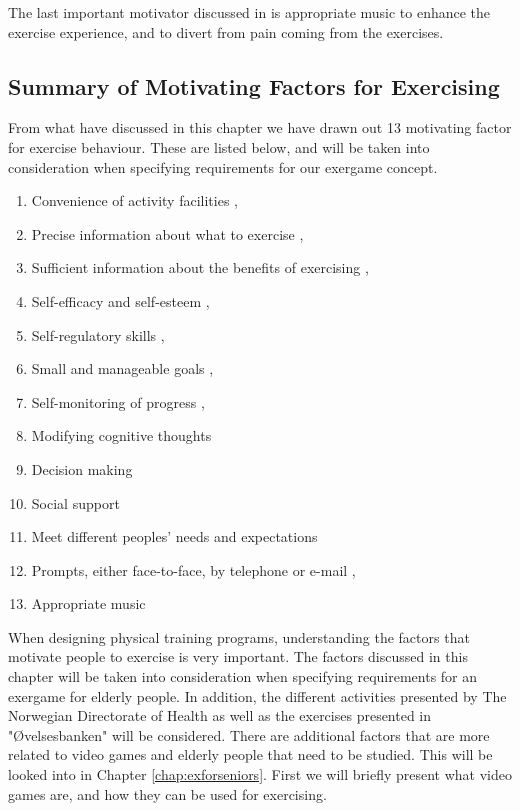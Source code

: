 The last important motivator discussed in \cite{schutzer} is appropriate music to enhance the exercise experience, and to divert from pain coming from the exercises. 


\subsection{Summary of Motivating Factors for Exercising}
\label{subsec:motivator}

From what have discussed in this chapter we have drawn out 13 motivating factor for exercise behaviour. These are listed below, and will be taken into consideration when specifying requirements for our exergame concept. 

\begin{enumerate}[{m}.1]
\item Convenience of activity facilities \cite{chao}, \cite{schutzer}
\item Precise information about what to exercise \cite{chao}, \cite{schutzer}
\item Sufficient information about the benefits of exercising \cite{chao}, \cite{schutzer}
\item Self-efficacy and self-esteem \cite{schutzer}, \cite{white}
\item Self-regulatory skills \cite{chao}, \cite{schutzer}
\item Small and manageable goals \cite{chao},\cite{schutzer}
\item Self-monitoring of progress \cite{chao},\cite{schutzer}
\item Modifying cognitive thoughts \cite{chao}
\item Decision making \cite{chao}
\item Social support \cite{chao}
\item Meet different peoples' needs and expectations \cite{chao}
\item Prompts, either face-to-face, by telephone or e-mail \cite{chao},\cite{schutzer}
\item Appropriate music \cite{schutzer}
\end{enumerate} 

\bigskip

When designing physical training programs, understanding the factors that motivate people to exercise is very important. The factors discussed in this chapter will be taken into consideration when specifying requirements for an exergame for elderly people. In addition, the different activities presented by The Norwegian Directorate of Health as well as the exercises presented in "Øvelsesbanken" will be considered. There are additional factors that are more related to video games and elderly people that need to be studied. This will be looked into in Chapter \ref{chap:exforseniors}. First we will briefly present what video games are, and how they can be used for exercising. 




